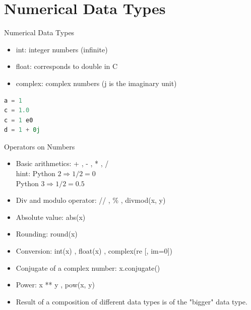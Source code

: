 \documentclass[xcolor=dvipsnames,aspectratio=169]{beamer}
\begin{document}
\section{Numerical Data Types}
\begin{frame}[fragile]{Numerical Data Types}
\begin{itemize}
	\item int: integer numbers (infinite)
	\item float: corresponds to double in C
	\item complex: complex numbers (j is the imaginary unit)
\end{itemize}

\begin{lstlisting}[language=Python]
a = 1
c = 1.0
c = 1 e0
d = 1 + 0j
\end{lstlisting}
\end{frame}

\begin{frame}[fragile]{Operators on Numbers}
\begin{itemize}
	\item Basic arithmetics: + , - , * , /\\
	hint: Python $2 \Rightarrow 1/2 = 0$\\
	Python $3 \Rightarrow 1/2 = 0.5$
	\item Div and modulo operator: // , \% , divmod(x, y)
	\item Absolute value: abs(x)
	\item Rounding: round(x)
	\item Conversion: int(x) , float(x) , complex(re [, im=0])
	\item Conjugate of a complex number: x.conjugate()
	\item Power: x ** y , pow(x, y)
	\item Result of a composition of different data types is of the "bigger" data type.
\end{itemize}
\end{frame}
\end{document}
